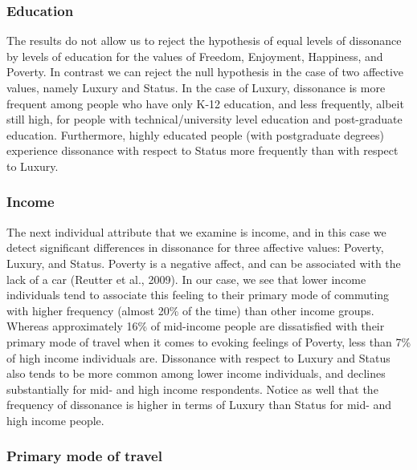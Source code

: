 \documentclass[]{elsarticle} %
\begin{document}
\hypertarget{education}{%
\subsubsection{Education}\label{education}}

The results do not allow us to reject the hypothesis of equal levels of
dissonance by levels of education for the values of Freedom, Enjoyment,
Happiness, and Poverty. In contrast we can reject the null hypothesis in
the case of two affective values, namely Luxury and Status. In the case
of Luxury, dissonance is more frequent among people who have only K-12
education, and less frequently, albeit still high, for people with
technical/university level education and post-graduate education.
Furthermore, highly educated people (with postgraduate degrees)
experience dissonance with respect to Status more frequently than with
respect to Luxury.

\hypertarget{income}{%
\subsubsection{Income}\label{income}}

The next individual attribute that we examine is income, and in this
case we detect significant differences in dissonance for three affective
values: Poverty, Luxury, and Status. Poverty is a negative affect, and
can be associated with the lack of a car (Reutter et al., 2009). In our
case, we see that lower income individuals tend to associate this
feeling to their primary mode of commuting with higher frequency (almost
20\% of the time) than other income groups. Whereas approximately 16\%
of mid-income people are dissatisfied with their primary mode of travel
when it comes to evoking feelings of Poverty, less than 7\% of high
income individuals are. Dissonance with respect to Luxury and Status
also tends to be more common among lower income individuals, and
declines substantially for mid- and high income respondents. Notice as
well that the frequency of dissonance is higher in terms of Luxury than
Status for mid- and high income people.

\hypertarget{primary-mode-of-travel}{%
\subsubsection{Primary mode of travel}\label{primary-mode-of-travel}}
\end{document}
